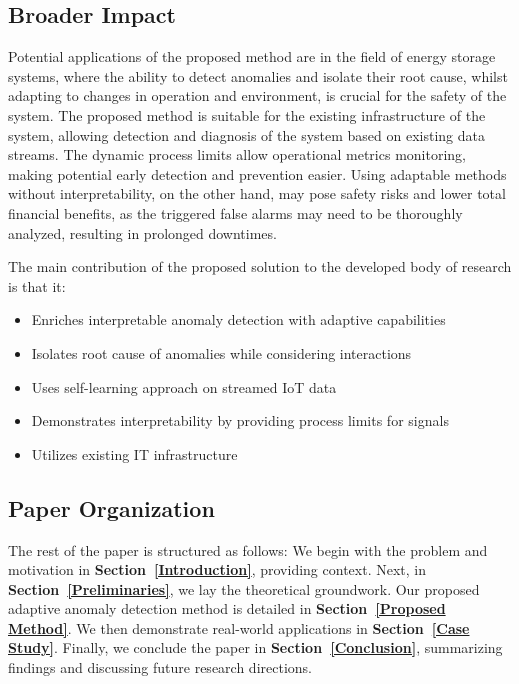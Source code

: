 \subsection{Broader Impact}
Potential applications of the proposed method are in the field of energy storage systems, where the ability to detect anomalies and isolate their root cause, whilst adapting to changes in operation and environment, is crucial for the safety of the system. The proposed method is suitable for the existing infrastructure of the system, allowing detection and diagnosis of the system based on existing data streams. The dynamic process limits allow operational metrics monitoring, making potential early detection and prevention easier. Using adaptable methods without interpretability, on the other hand, may pose safety risks and lower total financial benefits, as the triggered false alarms may need to be thoroughly analyzed, resulting in prolonged downtimes.

The main contribution of the proposed solution to the developed body of research is that it:
\begin{itemize}
\item Enriches interpretable anomaly detection with adaptive capabilities
\item Isolates root cause of anomalies while considering interactions
\item Uses self-learning approach on streamed IoT data
\item Demonstrates interpretability by providing process limits for signals
\item Utilizes existing IT infrastructure
\end{itemize}

\subsection{Paper Organization}
The rest of the paper is structured as follows: We begin with the problem and motivation in \textbf{Section~\ref{Introduction}}, providing context. Next, in \textbf{Section~\ref{Preliminaries}}, we lay the theoretical groundwork. Our proposed adaptive anomaly detection method is detailed in \textbf{Section~\ref{Proposed Method}}. We then demonstrate real-world applications in \textbf{Section~\ref{Case Study}}. Finally, we conclude the paper in \textbf{Section~\ref{Conclusion}}, summarizing findings and discussing future research directions.
